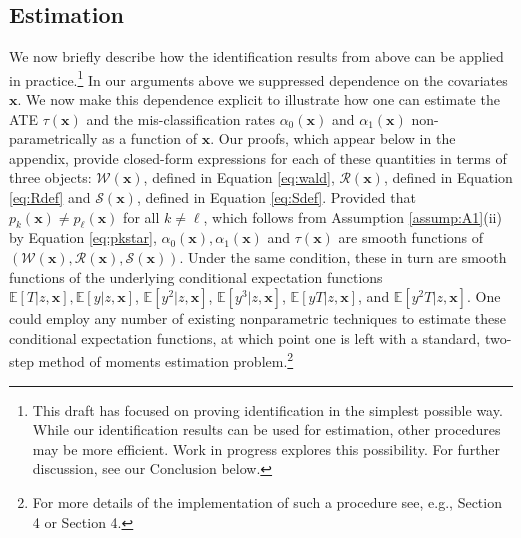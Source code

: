 \subsection{Estimation}
We now briefly describe how the identification results from above can be applied in practice.\footnote{This draft has focused on proving identification in the simplest possible way. While our identification results can be used for estimation, other procedures may be more efficient. Work in progress explores this possibility. For further discussion, see our Conclusion below.}
In our arguments above we suppressed dependence on the covariates $\mathbf{x}$. 
We now make this dependence explicit to illustrate how one can estimate the ATE $\tau(\mathbf{x})$ and the mis-classification rates $\alpha_0(\mathbf{x})$ and $\alpha_1(\mathbf{x})$ non-parametrically as a function of $\mathbf{x}$.
Our proofs, which appear below in the appendix, provide closed-form expressions for each of these quantities in terms of three objects: $\mathcal{W}(\mathbf{x})$, defined in Equation \ref{eq:wald}, $\mathcal{R}(\mathbf{x})$, defined in Equation \ref{eq:Rdef} and $\mathcal{S}(\mathbf{x})$, defined in Equation \ref{eq:Sdef}.
Provided that $p_k(\mathbf{x}) \neq p_\ell(\mathbf{x})$ for all $k\neq \ell$, which follows from Assumption \ref{assump:A1}(ii) by Equation \ref{eq:pkstar},  $\alpha_0(\mathbf{x}), \alpha_1(\mathbf{x})$ and $\tau(\mathbf{x})$ are smooth functions of $\left(\mathcal{W}(\mathbf{x}), \mathcal{R}(\mathbf{x}), \mathcal{S}(\mathbf{x})\right)$.
Under the same condition, these in turn are smooth functions of  the underlying conditional expectation functions $ \mathbb{E}\left[ T|z,\mathbf{x} \right], \mathbb{E}\left[y| z,\mathbf{x} \right]$, $\mathbb{E}\left[y^2| z,\mathbf{x} \right]$, $\mathbb{E}\left[y^3| z,\mathbf{x} \right]$, $\mathbb{E}\left[yT| z,\mathbf{x} \right]$, and  $\mathbb{E}\left[y^2T| z,\mathbf{x} \right]$.
One could employ any number of existing nonparametric techniques to estimate these conditional expectation functions, at which point one is left with a standard, two-step method of moments estimation problem.\footnote{For more details of the implementation of such a procedure see, e.g., \cite{Mahajan} Section 4 or \cite{Lewbel} Section 4.}
